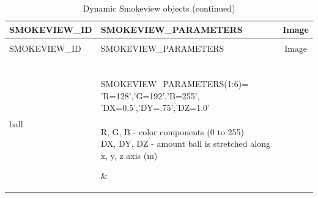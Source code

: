 \begin{longtable}[ht]{|l|l|c|}
\caption{Dynamic Smokeview objects}
\label{tab:devices_dynamic}
\\ \hline
{\ct SMOKEVIEW\_ID}  & {\ct SMOKEVIEW\_PARAMETERS} & Image  \\ \hline \hline
\endfirsthead
\caption{Dynamic Smokeview objects (continued)}
\\ \hline
{\ct SMOKEVIEW\_ID}  & {\ct SMOKEVIEW\_PARAMETERS} & Image  \\ \hline \hline
\endhead

{\ct ball} &
\parbox[c]{\boxwidth}{
\hspace{1in} \\
{\ct SMOKEVIEW\_PARAMETERS(1:6)=}\\
{\ct 'R=128','G=192','B=255',}\\
{\ct 'DX=0.5','DY=.75','DZ=1.0'}\\  \\
R, G, B - color components (0 to 255) \\
DX, DY, DZ - amount ball is stretched along x, y, z axis (m) \\
\hspace{1in} } &
 \\ \hline

{\ct cone} &
\parbox[c]{\boxwidth}{
\hspace{1in} \\
{\ct SMOKEVIEW\_PARAMETERS(1:5)=}\\
{\ct 'R=128','G=255','B=192',}\\
{\ct 'D=0.4','H=0.6'}\\ \\
R, G, B - color components ranging (0 to 255) \\
D, H - diameter and height (m) \\
\hspace{1in}
} &
 \\ \hline

{\ct fan} &
\parbox[c]{\boxwidth}{
\hspace{1in} \\
{\ct SMOKEVIEW\_PARAMETERS(1:11)=}\\
{\ct 'HUB\_R=0','HUB\_G=0','HUB\_B=0',}\\
{\ct 'HUB\_D=0.1','HUB\_L=0.12',}\\
{\ct 'BLADE\_R=128','BLADE\_G=64',}\\
{\ct 'BLADE\_B=32','BLADE\_ANGLE=60.0',}\\
{\ct 'BLADE\_D=0.5','BLADE\_H=0.09'}\\  \\
HUB\_R, HUB\_G, HUB\_B - color components of fan hub (0 to 255) \\
HUB\_D, HUB\_L - diameter and length of fan hub (m) \\
BLADE\_R, BLADE\_G, BLADE\_B - color components of fan blades (0 to 255) \\
BLADE\_ANGLE, BLADE\_D, BLADE\_H - angle, diameter and height of a fan blade \\
\hspace{1in}
} &
 \\ \hline


\end{longtable}
